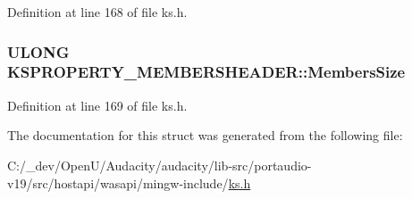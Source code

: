 Definition at line 168 of file ks.\+h.

\subsubsection[{\texorpdfstring{Members\+Size}{MembersSize}}]{\setlength{\rightskip}{0pt plus 5cm}U\+L\+O\+NG K\+S\+P\+R\+O\+P\+E\+R\+T\+Y\+\_\+\+M\+E\+M\+B\+E\+R\+S\+H\+E\+A\+D\+E\+R\+::\+Members\+Size}\hypertarget{struct_k_s_p_r_o_p_e_r_t_y___m_e_m_b_e_r_s_h_e_a_d_e_r_ab3b54cd17776211c90863bdad4485513}{}\label{struct_k_s_p_r_o_p_e_r_t_y___m_e_m_b_e_r_s_h_e_a_d_e_r_ab3b54cd17776211c90863bdad4485513}


Definition at line 169 of file ks.\+h.



The documentation for this struct was generated from the following file\+:\begin{DoxyCompactItemize}
\item 
C\+:/\+\_\+dev/\+Open\+U/\+Audacity/audacity/lib-\/src/portaudio-\/v19/src/hostapi/wasapi/mingw-\/include/\hyperlink{ks_8h}{ks.\+h}\end{DoxyCompactItemize}
